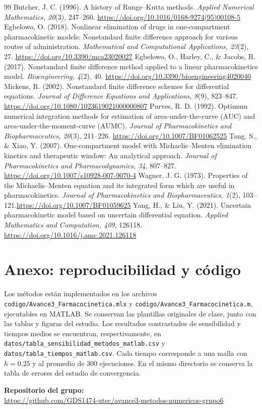 \documentclass[11pt,final,5p,times,twocolumn,authoryear]{elsarticle}
\begin{document}
\setlength{\bibsep}{0pt}
\begin{thebibliography}{99}
Butcher, J. C. (1996). A history of Runge--Kutta methods. \emph{Applied Numerical Mathematics, 20}(3), 247--260. \url{https://doi.org/10.1016/0168-9274(95)00108-5}
Egbelowo, O. (2018). Nonlinear elimination of drugs in one-compartment pharmacokinetic models: Nonstandard finite difference approach for various routes of administration. \emph{Mathematical and Computational Applications, 23}(2), 27. \url{https://doi.org/10.3390/mca23020027}
Egbelowo, O., Harley, C., \& Jacobs, B. (2017). Nonstandard finite difference method applied to a linear pharmacokinetics model. \emph{Bioengineering, 4}(2), 40. \url{https://doi.org/10.3390/bioengineering4020040}
Mickens, R. (2002). Nonstandard finite difference schemes for differential equations. \emph{Journal of Difference Equations and Applications, 8}(9), 823--847. \url{https://doi.org/10.1080/1023619021000000807}
Purves, R. D. (1992). Optimum numerical integration methods for estimation of area-under-the-curve (AUC) and area-under-the-moment-curve (AUMC). \emph{Journal of Pharmacokinetics and Biopharmaceutics, 20}(3), 211--226. \url{https://doi.org/10.1007/BF01062525}
Tang, S., \& Xiao, Y. (2007). One-compartment model with Michaelis--Menten elimination kinetics and therapeutic window: An analytical approach. \emph{Journal of Pharmacokinetics and Pharmacodynamics, 34}, 807--827. \url{https://doi.org/10.1007/s10928-007-9070-4}
Wagner, J. G. (1973). Properties of the Michaelis--Menten equation and its integrated form which are useful in pharmacokinetics. \emph{Journal of Pharmacokinetics and Biopharmaceutics, 1}(2), 103--121.\enspace\url{https://doi.org/10.1007/BF01059625}
Yang, H., \& Liu, Y. (2021). Uncertain pharmacokinetic model based on uncertain differential equation. \emph{Applied Mathematics and Computation, 409}, 126118. \url{https://doi.org/10.1016/j.amc.2021.126118}
\end{thebibliography}

\clearpage
\appendix
\section*{Anexo: reproducibilidad y código}
Los métodos están implementados en los archivos \texttt{codigo/Avance3\_Farmacocinetica.mlx} y \texttt{codigo/Avance3\_Farmacocinetica.m}, ejecutables en MATLAB. Se conservan las plantillas originales de clase, junto con las tablas y figuras del estudio. Los resultados contrastados de sensibilidad y tiempos medios se encuentran, respectivamente, en \texttt{datos/tabla\_sensibilidad\_metodos\_matlab.csv} y \texttt{datos/tabla\_tiempos\_matlab.csv}. Cada tiempo corresponde a una malla con $h=0.25$ y al promedio de $300$ ejecuciones. En el mismo directorio se conserva la tabla de errores del estudio de convergencia.

\noindent\textbf{Repositorio del grupo:}\\
\url{https://github.com/GDS1474-utec/avance3-metodos-numericos-grupo6}
\end{document}

